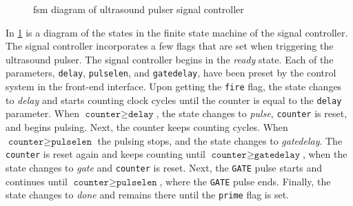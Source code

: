 \begin{figure}[htbp]
	\centering
	\caption{\gls{fsm} diagram of ultrasound pulser signal controller}
	\label{fig:4_controlsystem_fsm_diagram}
\end{figure}
In \cref{fig:4_controlsystem_fsm_diagram} is a diagram of the states in the finite state machine of the signal controller. The signal controller incorporates a few flags that are set when triggering the ultrasound pulser. The signal controller begins in the \textit{ready} state. Each of the parameters, \texttt{delay}, \texttt{pulselen}, and \texttt{gatedelay}, have been preset by the control system in the front-end interface. Upon getting the \texttt{fire} flag, the state changes to \textit{delay} and starts counting clock cycles until the counter is equal to the \texttt{delay} parameter. When $\texttt{counter}\ge\texttt{delay}$, the state changes to \textit{pulse}, \texttt{counter} is reset, and begins pulsing. Next, the counter keeps counting cycles. When $\texttt{counter}\ge\texttt{pulselen}$ the pulsing stops, and the state changes to \textit{gatedelay}. The \texttt{counter} is reset again and keeps counting until $\texttt{counter}\ge\texttt{gatedelay}$, when the state changes to \textit{gate} and \texttt{counter} is reset. Next, the \texttt{GATE} pulse starts and continues until $\texttt{counter}\ge\texttt{pulselen}$, where the \texttt{GATE} pulse ends. Finally, the state changes to \textit{done} and remains there until the \texttt{prime} flag is set.

